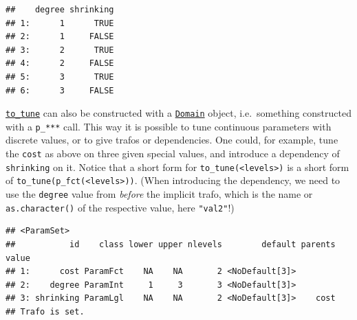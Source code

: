 \documentclass[
]{scrbook}
\newenvironment{Shaded}{\begin{snugshade}}{\end{snugshade}}
\newcommand{\AttributeTok}[1]{\textcolor[rgb]{0.77,0.63,0.00}{#1}}
\newcommand{\CommentTok}[1]{\textcolor[rgb]{0.56,0.35,0.01}{\textit{#1}}}
\newcommand{\FloatTok}[1]{\textcolor[rgb]{0.00,0.00,0.81}{#1}}
\newcommand{\FunctionTok}[1]{\textcolor[rgb]{0.00,0.00,0.00}{#1}}
\newcommand{\NormalTok}[1]{#1}
\newcommand{\OtherTok}[1]{\textcolor[rgb]{0.56,0.35,0.01}{#1}}
\newcommand{\SpecialCharTok}[1]{\textcolor[rgb]{0.00,0.00,0.00}{#1}}
\newcommand{\StringTok}[1]{\textcolor[rgb]{0.31,0.60,0.02}{#1}}
\renewenvironment{Shaded} {\begin{snugshade}\small} {\end{snugshade}}
\begin{document}
\begin{verbatim}
##    degree shrinking
## 1:      1      TRUE
## 2:      1     FALSE
## 3:      2      TRUE
## 4:      2     FALSE
## 5:      3      TRUE
## 6:      3     FALSE
\end{verbatim}

\href{https://paradox.mlr-org.com/reference/to_tune.html}{\texttt{to\_tune}} can also be constructed with a \href{https://paradox.mlr-org.com/reference/Domain.html}{\texttt{Domain}} object, i.e.~something constructed with a \texttt{p\_***} call.
This way it is possible to tune continuous parameters with discrete values, or to give trafos or dependencies.
One could, for example, tune the \texttt{cost} as above on three given special values, and introduce a dependency of \texttt{shrinking} on it.
Notice that a short form for \texttt{to\_tune(\textless{}levels\textgreater{})} is a short form of \texttt{to\_tune(p\_fct(\textless{}levels\textgreater{}))}.
(When introducing the dependency, we need to use the \texttt{degree} value from \emph{before} the implicit trafo, which is the name or \texttt{as.character()} of the respective value, here \texttt{"val2"}!)

\begin{Shaded}
\end{Shaded}

\begin{verbatim}
## <ParamSet>
##           id    class lower upper nlevels        default parents value
## 1:      cost ParamFct    NA    NA       2 <NoDefault[3]>              
## 2:    degree ParamInt     1     3       3 <NoDefault[3]>              
## 3: shrinking ParamLgl    NA    NA       2 <NoDefault[3]>    cost      
## Trafo is set.
\end{verbatim}
\end{document}
